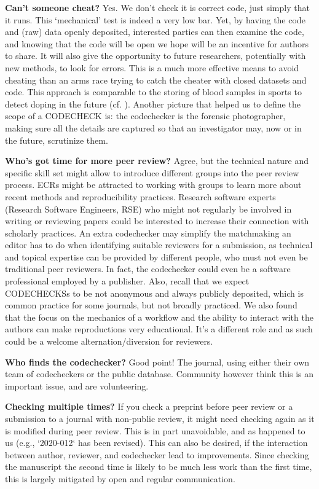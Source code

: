 \documentclass[12pt]{article}
\begin{document}
\textbf{Can't someone cheat?} Yes. We don't check it is correct code,
just simply that it runs. This `mechanical' test is indeed a very low bar.
Yet, by having the code and (raw) data openly deposited, interested parties can
then examine the code, and knowing that the code will be open we hope will
be an incentive for authors to share. It will also give the opportunity 
to future researchers, potentially with new methods, to look for errors.
This is a much more effective means to avoid cheating than an arms race
trying to catch the cheater with closed datasets and code. This approach
is comparable to the storing of blood samples in sports to detect
doping in the future (cf. \cite{everythinghertz97}).
Another picture that helped us to define the scope of a CODECHECK is:
the codechecker is the forensic photographer, making sure all the details
are captured so that an investigator may, now or in the future, scrutinize
them.

\textbf{Who's got time for more peer review?} Agree, but the technical
nature and specific skill set might allow to introduce different groups
into the peer review process. ECRs might be attracted to working with
groups to learn more about recent methods and reproducibility practices.
Research software experts (Research Software Engineers, RSE) who might
not regularly be involved in writing or reviewing papers could be 
interested to increase their connection with scholarly practices.
An extra codechecker may simplify the matchmaking an editor has to do
when identifying suitable reviewers for a submission, as technical and
topical expertise can be provided by different people, who must not even
be traditional peer reviewers. In fact, the codechecker could even be
a software professional employed by a publisher.
Also, recall that we expect CODECHECKSs to be not anonymous and always
publicly deposited, which is common practice for some journals, but not
broadly practiced. We also found that the focus on the mechanics of a
workflow and the ability to interact with the authors can make
reproductions very educational. It's a different role and as such could
be a welcome alternation/diversion for reviewers.

\textbf{Who finds the codechecker?} Good point! The journal, using either
their own team of codecheckers or the public database. Community
however think this is an important issue, and are volunteering.

\textbf{Checking multiple times?} If you check a preprint before peer
review or a submission to a journal with non-public review,
it might need checking again as it is modified during peer
review.  This is in part unavoidable, and as happened to us (e.g., 
`2020-012` has been revised). This can also be desired, if the
interaction between author, reviewer, and codechecker lead to
improvements.
Since checking the manuscript the second time is likely to be
much less work than the first time, this is largely mitigated by 
open and regular communication.
\end{document}
